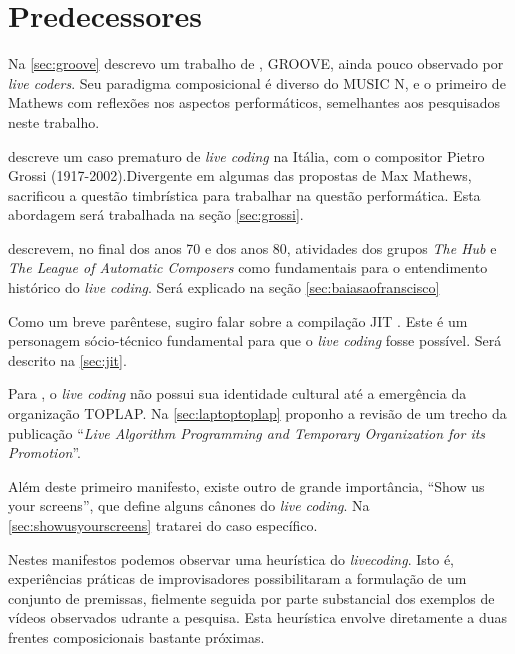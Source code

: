 

\section{Predecessores}

Na \autoref{sec:groove} descrevo um trabalho de , GROOVE, ainda pouco observado por \emph{live coders}. Seu paradigma composicional é diverso do MUSIC N, e o primeiro de Mathews com reflexões nos aspectos performáticos, semelhantes aos pesquisados neste trabalho.

  descreve um caso prematuro de \emph{live coding} na Itália, com o compositor Pietro Grossi (1917-2002).Divergente em algumas das propostas de Max Mathews, sacrificou a questão timbrística para trabalhar na questão performática. Esta abordagem será trabalhada na seção \autoref{sec:grossi}.

 descrevem, no final dos anos 70 e dos anos 80, atividades dos grupos \emph{The Hub} e \emph{The League of Automatic Composers} como fundamentais para o entendimento histórico do \emph{live coding}. Será explicado na seção \autoref{sec:baiasaofranscisco}

Como um breve parêntese, sugiro falar sobre a compilação JIT \cite{aycock_brief_2003}. Este é um personagem sócio-técnico fundamental para que o \emph{live coding} fosse possível. Será descrito na \autoref{sec:jit}.

Para , o \emph{live coding} não possui sua identidade cultural até a emergência da organização TOPLAP. Na \autoref{sec:laptoptoplap} proponho a revisão de um trecho da publicação ``\emph{Live Algorithm Programming and Temporary Organization for its Promotion}''.

Além deste primeiro manifesto, existe outro de grande importância, ``Show us your screens'', que define alguns cânones do \emph{live coding}. Na \autoref{sec:showusyourscreens} tratarei do caso específico.

Nestes manifestos podemos observar uma heurística do \emph{livecoding}. Isto é, experiências práticas de improvisadores \cite{ward_live_2004} possibilitaram a formulação de um conjunto de premissas, fielmente seguida por parte substancial dos exemplos de vídeos observados udrante a pesquisa. Esta heurística envolve diretamente a duas frentes composicionais bastante próximas.

